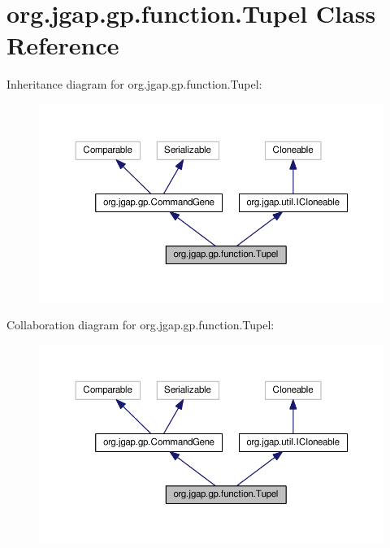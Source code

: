 \hypertarget{classorg_1_1jgap_1_1gp_1_1function_1_1_tupel}{\section{org.\-jgap.\-gp.\-function.\-Tupel Class Reference}
\label{classorg_1_1jgap_1_1gp_1_1function_1_1_tupel}
}


Inheritance diagram for org.\-jgap.\-gp.\-function.\-Tupel\-:
\nopagebreak
\begin{figure}[H]
\begin{center}
\leavevmode
\includegraphics[width=350pt]{classorg_1_1jgap_1_1gp_1_1function_1_1_tupel__inherit__graph}
\end{center}
\end{figure}


Collaboration diagram for org.\-jgap.\-gp.\-function.\-Tupel\-:
\nopagebreak
\begin{figure}[H]
\begin{center}
\leavevmode
\includegraphics[width=350pt]{classorg_1_1jgap_1_1gp_1_1function_1_1_tupel__coll__graph}
\end{center}
\end{figure}
